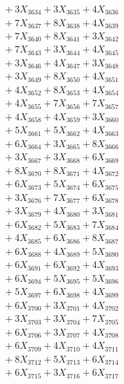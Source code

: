 \documentclass[a4paper,10pt]{article}
\begin{document}
{\begin{align}
&\;  + 3 X_{3634} + 3 X_{3635} + 4 X_{3636} \\[0.3ex]
&\;  + 7 X_{3637} + 8 X_{3638} + 4 X_{3639} \\[0.5ex]\allowbreak
&\;  + 7 X_{3640} + 8 X_{3641} + 3 X_{3642} \\[0.3ex]
&\;  + 7 X_{3643} + 3 X_{3644} + 4 X_{3645} \\[0.3ex]
&\;  + 3 X_{3646} + 4 X_{3647} + 3 X_{3648} \\[0.3ex]
&\;  + 3 X_{3649} + 8 X_{3650} + 4 X_{3651} \\[0.3ex]
&\;  + 4 X_{3652} + 8 X_{3653} + 4 X_{3654} \\[0.3ex]
&\;  + 4 X_{3655} + 7 X_{3656} + 7 X_{3657} \\[0.3ex]
&\;  + 4 X_{3658} + 4 X_{3659} + 3 X_{3660} \\[0.3ex]
&\;  + 5 X_{3661} + 5 X_{3662} + 4 X_{3663} \\[0.3ex]
&\;  + 6 X_{3664} + 3 X_{3665} + 8 X_{3666} \\[0.3ex]
&\;  + 3 X_{3667} + 3 X_{3668} + 6 X_{3669} \\[0.5ex]\allowbreak
&\;  + 8 X_{3670} + 8 X_{3671} + 4 X_{3672} \\[0.3ex]
&\;  + 6 X_{3673} + 5 X_{3674} + 6 X_{3675} \\[0.3ex]
&\;  + 3 X_{3676} + 7 X_{3677} + 6 X_{3678} \\[0.3ex]
&\;  + 3 X_{3679} + 4 X_{3680} + 3 X_{3681} \\[0.3ex]
&\;  + 6 X_{3682} + 5 X_{3683} + 7 X_{3684} \\[0.3ex]
&\;  + 4 X_{3685} + 6 X_{3686} + 8 X_{3687} \\[0.3ex]
&\;  + 6 X_{3688} + 4 X_{3689} + 5 X_{3690} \\[0.3ex]
&\;  + 6 X_{3691} + 6 X_{3692} + 4 X_{3693} \\[0.3ex]
&\;  + 6 X_{3694} + 5 X_{3695} + 5 X_{3696} \\[0.3ex]
&\;  + 5 X_{3697} + 6 X_{3698} + 4 X_{3699} \\[0.5ex]\allowbreak
&\;  + 6 X_{3700} + 3 X_{3701} + 4 X_{3702} \\[0.3ex]
&\;  + 3 X_{3703} + 3 X_{3704} + 7 X_{3705} \\[0.3ex]
&\;  + 6 X_{3706} + 3 X_{3707} + 4 X_{3708} \\[0.3ex]
&\;  + 6 X_{3709} + 4 X_{3710} + 4 X_{3711} \\[0.3ex]
&\;  + 8 X_{3712} + 5 X_{3713} + 6 X_{3714} \\[0.3ex]
&\;  + 6 X_{3715} + 3 X_{3716} + 6 X_{3717} \\[0.3ex]

\end{align}}
\end{document}
